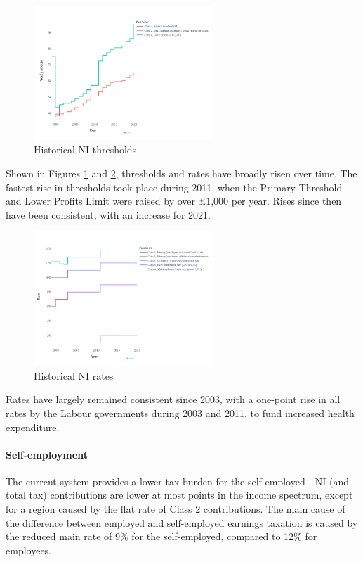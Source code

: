\documentclass{article}
\begin{document}
    \begin{figure}
        \centering
        \includegraphics[width=0.6\textwidth]{images/fig_6.png}
        \caption{Historical NI thresholds}
        \label{fig:NI_thresholds}
    \end{figure}

    Shown in Figures \ref{fig:NI_thresholds} and \ref{fig:NI_rates}, thresholds and rates have broadly risen over time. The fastest rise in thresholds took place during 2011, when the Primary Threshold and Lower Profits Limit were raised by over £1,000 per year. Rises since then have been consistent, with an increase for 2021.
    
    \begin{figure}
        \centering
        \includegraphics[width=0.6\textwidth]{images/fig_7.png}
        \caption{Historical NI rates}
        \label{fig:NI_rates}
    \end{figure}

    Rates have largely remained consistent since 2003, with a one-point rise in all rates by the Labour governments during 2003 and 2011, to fund increased health expenditure.

    \paragraph{Self-employment} The current system provides a lower tax burden for the self-employed - NI (and total tax) contributions are lower at most points in the income spectrum, except for a region caused by the flat rate of Class 2 contributions. The main cause of the difference between employed and self-employed earnings taxation is caused by the reduced main rate of 9\% for the self-employed, compared to 12\% for employees. 
    
\end{document}
